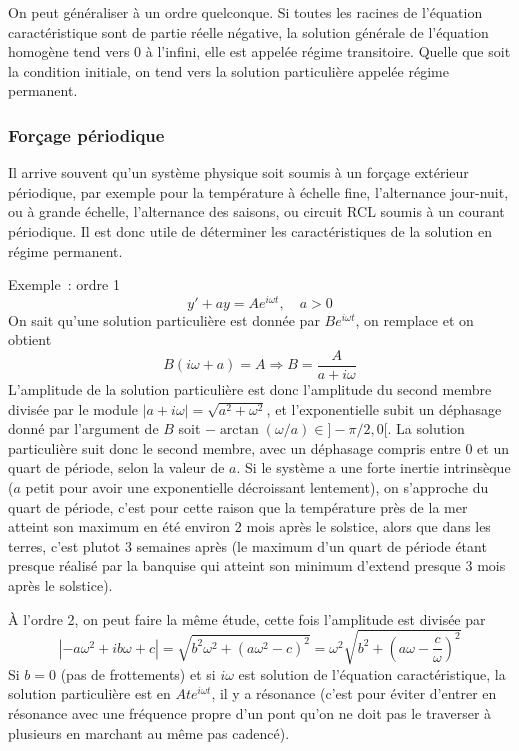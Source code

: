 \documentclass[a4paper,11pt]{article}
\begin{document}
\begin{giacjshere}
On peut g\'en\'eraliser \`a un ordre quelconque.
Si toutes les racines de l'\'equation caract\'eristique sont
de partie r\'eelle n\'egative, la solution g\'en\'erale
de l'\'equation homog\`ene tend vers 0 \`a l'infini,
elle est appel\'ee r\'egime transitoire. Quelle que
soit la condition initiale, on tend vers la solution particuli\`ere
appel\'ee r\'egime permanent.

\subsubsection{For\c{c}age p\'eriodique}
Il arrive souvent qu'un syst\`eme physique soit soumis \`a
un for\c{c}age ext\'erieur p\'eriodique, par exemple
pour la temp\'erature \`a \'echelle fine, l'alternance jour-nuit,
ou \`a grande \'echelle, l'alternance des saisons, ou
circuit RCL soumis \`a un courant p\'eriodique. Il est donc
utile de d\'eterminer les caract\'eristiques de la solution
en r\'egime permanent.

Exemple~: ordre 1
$$ y'+ay=A e^{i\omega t}, \quad a>0$$
On sait qu'une solution particuli\`ere est donn\'ee par
$ B e^{i \omega t}$, on remplace et on obtient
$$ B(i\omega +a)=A \Rightarrow B=\frac{A}{a+i\omega}$$
L'amplitude de la solution particuli\`ere est donc l'amplitude
du second membre divis\'ee par le module 
$|a+i\omega|=\sqrt{a^2+\omega^2}$, et l'exponentielle subit
un d\'ephasage donn\'e par l'argument de $B$ soit
$-\arctan(\omega/a) \in ]-\pi/2,0[$. La solution
particuli\`ere suit donc le second membre, avec un d\'ephasage
compris entre 0 et un quart de p\'eriode, selon la valeur de $a$.
Si le syst\`eme a une forte inertie intrins\`eque ($a$ petit
pour avoir une exponentielle d\'ecroissant lentement), on s'approche
du quart de p\'eriode, c'est pour cette raison que la temp\'erature
pr\`es de la mer atteint son maximum en \'et\'e environ 2 mois
apr\`es le solstice, alors que dans les terres, c'est plutot 3
semaines apr\`es (le maximum d'un quart de p\'eriode
\'etant presque r\'ealis\'e par la banquise qui atteint son
minimum d'extend presque 3 mois apr\`es le solstice).

\`A l'ordre 2, on peut faire la m\^eme \'etude, cette fois l'amplitude
est divis\'ee par
$$|-a\omega^2+ib\omega+c|
=\sqrt{ b^2\omega^2+(a\omega^2-c)^2}
=\omega^2 \sqrt{ b^2+(a\omega-\frac{c}{\omega})^2}$$
Si $b=0$ (pas de frottements) 
et si $i\omega$ est solution de l'\'equation caract\'eristique,
la solution particuli\`ere est en $ A t e^{i\omega t}$,
il y a r\'esonance (c'est pour \'eviter d'entrer en r\'esonance
avec une fr\'equence propre d'un pont qu'on ne doit pas le traverser
\`a plusieurs en marchant au m\^eme pas cadenc\'e).


\end{giacjshere}
\end{document}
